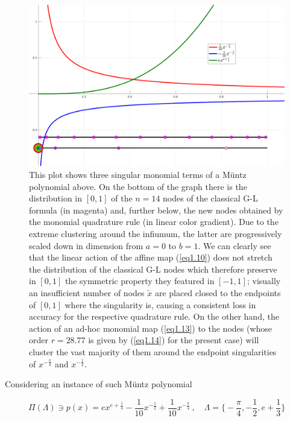 \documentclass[a4paper, twosided]{book}
\begin{document}
\begin{center}
        \begin{figure}[H]
        \captionsetup{singlelinecheck=off}
        \includegraphics[keepaspectratio, width=\textwidth]{images/GenPolyMonMap.png}
        \caption{This plot shows three singular monomial terms of a Müntz polynomial above. On the bottom of the graph there is the distribution in $[0,1]$ of the $n=14$ nodes of the classical G-L formula (in magenta) and, further below, the new nodes obtained by the monomial quadrature rule (in linear color gradient). Due to the extreme clustering around the infiumum, the latter are progressively scaled down in dimension from $a=0$ to $b=1$. We can clearly see that the linear action of the affine map (\ref{eq1.10}) does not stretch the distribution of the classical G-L nodes which therefore preserve in $[0,1]$ the symmetric property they featured in $[-1,1]$; visually an insufficient number of  nodes $\tilde{x}$ are placed closed to the endpoints of $[0,1]$ where the singularity is, causing a consistent loss in accuracy for the respective quadrature rule. On the other hand, the action of an ad-hoc monomial map (\ref{eq1.13}) to the nodes (whose order $r=28.77$ is given by (\ref{eq1.14}) for the present case) will cluster the vast majority of them around the endpoint singularities of $x^{-\frac{\pi}{4}}$ and $x^{-\frac{1}{2}}$.}
        \label{Fig1.2}
        \end{figure}
\end{center}

\noindent
Considering an instance of such Müntz polynomial

\begin{equation*}
    \Pi(\Lambda)\ni p(x) = ex^{e+\frac{1}{4}} -\frac{1}{10}x^{-\frac{1}{2}} + \frac{1}{10}x^{-\frac{\pi}{4}}\,,\quad\Lambda=\Big\{-\frac{\pi}{4},-\frac{1}{2},e+\frac{1}{3}\Big\}
\end{equation*}
\end{document}
